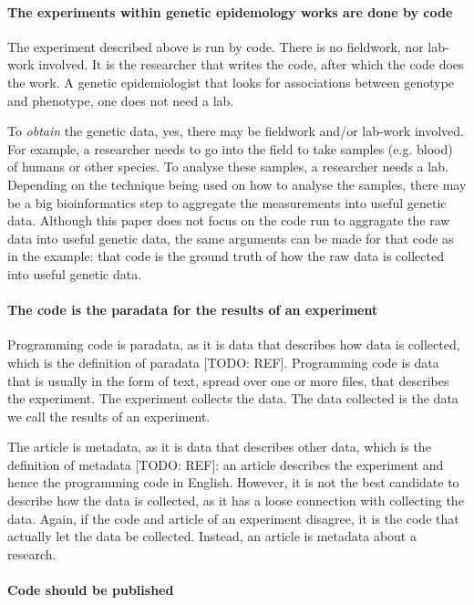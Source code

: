 \paragraph{The experiments within genetic epidemology works are done by code}

The experiment described above is run by code. There is no fieldwork,
nor lab-work involved. It is the researcher that writes the code,
after which the code does the work. A genetic epidemiologist that
looks for associations between genotype and phenotype,
one does not need a lab.

To \emph{obtain} the genetic data, yes, there may be fieldwork and/or lab-work
involved. For example, a researcher needs to go into the field to take
samples (e.g. blood) of humans or other species. To analyse these samples,
a researcher needs a lab. Depending on the technique being used on
how to analyse the samples, there may be a big bioinformatics step
to aggregate the measurements into useful genetic data. 
Although this paper does not focus on the code run to 
aggragate the raw data into useful genetic data, the same arguments
can be made for that code as in the example: that code is 
the ground truth of how the raw data is collected into useful genetic data.

\paragraph{The code is the paradata for the results of an experiment}

Programming code is paradata, as it is data that describes how data is collected,
which is the definition of paradata [TODO: REF].
Programming code is data that is usually in the form of text, 
spread over one or more files, that describes the experiment.
The experiment collects the data.
The data collected is the data we call the results of an experiment.

The article is metadata, as it is data that describes other
data, which is the definition of metadata [TODO: REF]:
an article describes the
experiment and hence the programming
code in English. However, it is not the best
candidate to describe how the data is collected,
as it has a loose connection with collecting the data.
Again, if the code and article of an experiment disagree,
it is the code that actually let the data be collected.  
Instead, an article is metadata about a research.

\paragraph{Code should be published}

